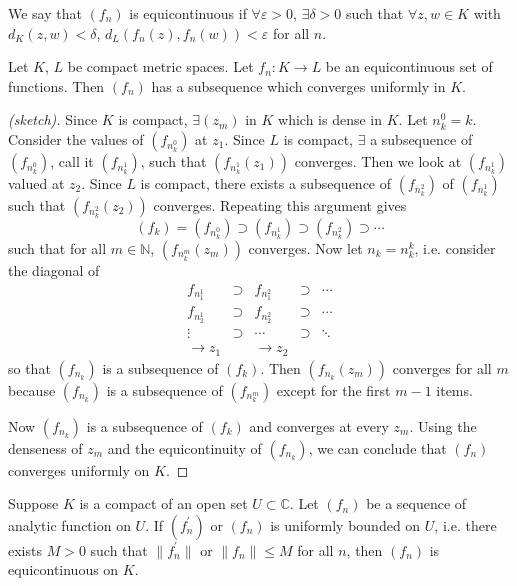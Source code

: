 \begin{defn}
We say that $(f_n)$ is equicontinuous if $\forall \varepsilon > 0$,
$\exists \delta > 0$ such that $\forall z, w \in K$ with
$d_K(z, w) < \delta$, $d_L(f_n(z), f_n(w)) < \varepsilon$ for all $n$.
\end{defn}

\begin{theorem}
Let $K$, $L$ be compact metric spaces. Let $f_n : K \to L$ be an
equicontinuous set of functions. Then $(f_n)$ has a subsequence which
converges uniformly in $K$.
\end{theorem}

\begin{proof}[(sketch)]
Since $K$ is compact, $\exists (z_m)$ in $K$ which is dense in $K$.
Let $n_k^0 = k$. Consider the values of $(f_{n_k^0})$ at $z_1$. Since
$L$ is compact, $\exists$ a subsequence of $(f_{n_k^0})$, call it
$(f_{n_k^1})$, such that $(f_{n_k^1}(z_1))$ converges. Then we look at
$(f_{n_k^1})$ valued at $z_2$. Since $L$ is compact, there exists a
subsequence of $(f_{n_k^2})$ of $(f_{n_k^1})$ such that
$(f_{n_k^2}(z_2))$ converges. Repeating this argument gives
$$
        (f_k)
=       (f_{n_k^0})
\supset (f_{n_k^1})
\supset (f_{n_k^2})
\supset \cdots
$$
such that for all $m \in \mathbb{N}$, $(f_{n_k^m}(z_m))$ converges.
Now let $n_k = n_k^k$, i.e. consider the diagonal of
\begin{align*}
  f_{n_1^1} & \supset & f_{n_1^2} & \supset & \cdots \\
  f_{n_2^1} & \supset & f_{n_2^2} & \supset & \cdots \\
  \vdots  & \supset & \cdots   & \supset & \ddots \\
  \to z_1 &         & \to z_2  &         &
\end{align*}
so that $(f_{n_k})$ is a subsequence of $(f_k)$. Then
$(f_{n_k}(z_m))$ converges for all $m$ because
$(f_{n_k})$ is a subsequence of $(f_{n_k^m})$ except for the first
$m-1$ items.

Now $(f_{n_k})$ is a subsequence of $(f_k)$ and converges at every
$z_m$. Using the denseness of $z_m$ and the equicontinuity of
$(f_{n_k})$, we can conclude that $(f_n)$ converges uniformly on $K$.
\end{proof}

\begin{lemma}
Suppose $K$ is a compact of an open set $U \subset\mathbb{C}$. Let
$(f_n)$ be a sequence of analytic function on $U$. If $(f_n^\prime)$
or $(f_n)$ is uniformly bounded on $U$, i.e. there exists $M > 0$
such that $\| f_n^\prime \|$ or $\| f_n \| \leq M$ for all $n$,
then $(f_n)$ is equicontinuous on $K$.
\end{lemma}

